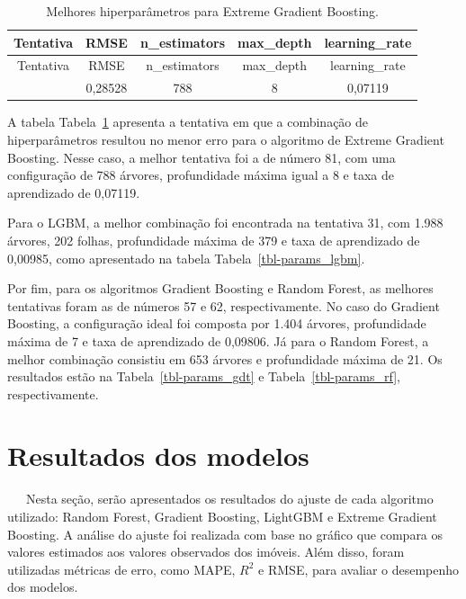 \documentclass[
  12pt,
  a4paper,
]{scrreprt}
\begin{document}
\begin{longtable}[]{@{}ccccc@{}}
\caption{Melhores hiperparâmetros para Extreme Gradient
Boosting.}\label{tbl-params_xgb}\tabularnewline
\toprule\noalign{}
Tentativa & RMSE & n\_estimators & max\_depth & learning\_rate \\
\midrule\noalign{}
\endfirsthead
\toprule\noalign{}
Tentativa & RMSE & n\_estimators & max\_depth & learning\_rate \\
\midrule\noalign{}
\endhead
\bottomrule\noalign{}
\endlastfoot
81 & 0,28528 & 788 & 8 & 0,07119 \\
\end{longtable}

A tabela Tabela~\ref{tbl-params_xgb} apresenta a tentativa em que a
combinação de hiperparâmetros resultou no menor erro para o algoritmo de
Extreme Gradient Boosting. Nesse caso, a melhor tentativa foi a de
número 81, com uma configuração de 788 árvores, profundidade máxima
igual a 8 e taxa de aprendizado de 0,07119.

\vspace{12pt}

Para o LGBM, a melhor combinação foi encontrada na tentativa 31, com
1.988 árvores, 202 folhas, profundidade máxima de 379 e taxa de
aprendizado de 0,00985, como apresentado na tabela
Tabela~\ref{tbl-params_lgbm}.

\vspace{12pt}

Por fim, para os algoritmos Gradient Boosting e Random Forest, as
melhores tentativas foram as de números 57 e 62, respectivamente. No
caso do Gradient Boosting, a configuração ideal foi composta por 1.404
árvores, profundidade máxima de 7 e taxa de aprendizado de 0,09806. Já
para o Random Forest, a melhor combinação consistiu em 653 árvores e
profundidade máxima de 21. Os resultados estão na
Tabela~\ref{tbl-params_gdt} e Tabela~\ref{tbl-params_rf},
respectivamente.

\section{Resultados dos modelos}\label{resultados-dos-modelos}

~~~Nesta seção, serão apresentados os resultados do ajuste de cada
algoritmo utilizado: Random Forest, Gradient Boosting, LightGBM e
Extreme Gradient Boosting. A análise do ajuste foi realizada com base no
gráfico que compara os valores estimados aos valores observados dos
imóveis. Além disso, foram utilizadas métricas de erro, como MAPE,
\(R^2\) e RMSE, para avaliar o desempenho dos modelos.
\end{document}
